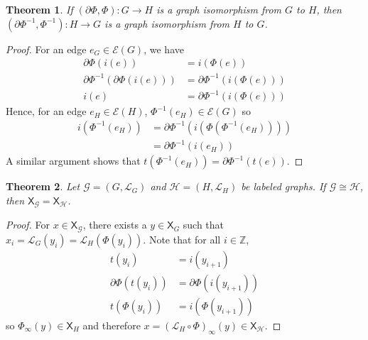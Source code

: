 \documentclass{article}
\newcommand{\Lc}{\mathcal{L}}  %
\newcommand{\Gc}{\mathcal{G}}  %
\newcommand{\Hc}{\mathcal{H}}  %
\newcommand{\Ec}{\mathcal{E}}
\newcommand{\shift}[1]{\mathsf{X}_{#1}}
\newtheorem{theorem}{Theorem}
\begin{document}
    \begin{theorem} 
        If \((\partial\Phi, \Phi) : G \to H\) is a graph isomorphism from \(G\) to \(H\),
        then \((\partial\Phi^{-1}, \Phi^{-1}): H \to G\) is a graph isomorphism from \(H\) to \(G\).
    \end{theorem}

    \begin{proof}
        For an edge \(e_G \in \Ec(G)\), we have 
        \begin{align*}
            \partial\Phi(i(e)) &= i(\Phi(e))  \\
            \partial\Phi^{-1}(\partial\Phi(i(e))) &= \partial\Phi^{-1}(i(\Phi(e)))\\
            i(e) &= \partial\Phi^{-1}(i(\Phi(e)))
        \end{align*}
        Hence, for an edge \(e_H \in \Ec(H)\), \(\Phi^{-1}(e_H) \in \Ec(G)\) so 
        \begin{align*}
            i(\Phi^{-1}(e_H)) &= \partial\Phi^{-1}(i(\Phi(\Phi^{-1}(e_H))))\\
            &= \partial\Phi^{-1}(i(e_H))
        \end{align*}
        A similar argument shows that \(t(\Phi^{-1}(e_H)) = \partial\Phi^{-1}(t(e))\).
        
    \end{proof}


    \begin{theorem}
        Let \(\Gc = (G, \Lc_G)\) and \(\Hc = (H, \Lc_H)\) be labeled graphs. 
        If \(\Gc \cong \Hc\), then \(\shift{\Gc} = \shift{\Hc}\).
    \end{theorem}

    \begin{proof}
        For \(x \in \shift{\Gc}\), there exists a \(y \in \shift{G}\) such that \(x_i = \Lc_G(y_i) = \Lc_H(\Phi(y_i))\).
        Note that for all \(i \in \mathbb{Z}\),
        \begin{align*}
            t(y_i) &= i(y_{i+1})\\
            \partial \Phi(t(y_i)) &= \partial\Phi(i(y_{i+1}))\\
            t(\Phi(y_i)) &= i(\Phi(y_{i+1}))
        \end{align*}
        so \(\Phi_\infty(y) \in \shift{H}\) and therefore \(x=\left( \Lc_H \circ \Phi \right)_\infty(y) \in \shift{\Hc}\).
    \end{proof}

    
\end{document}
